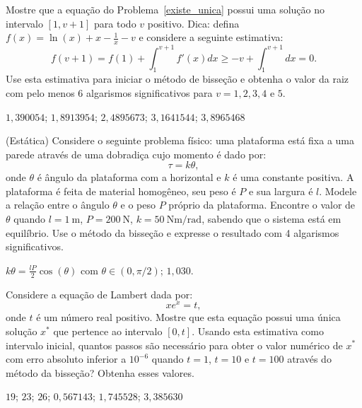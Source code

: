 \begin{exer} Mostre que a equação do Problema~\ref{existe_unica} possui uma solução no intervalo $[1, v+1]$ para todo $v$ positivo. Dica: defina $f(x)=\ln(x)+x-\frac{1}{x}-v$  e considere a seguinte estimativa:
  \begin{equation}
    f(v+1)=f(1)+\int_1^{v+1}f'(x)dx\geq -v+\int_1^{v+1}dx=0.
  \end{equation}
Use esta estimativa para iniciar o método de bisseção e obtenha o valor da raiz com pelo menos 6 algarismos significativos para $v=1, 2, 3, 4$ e $5$.
\end{exer}
\begin{resp}
    $1,390054$; $1,8913954$; $2,4895673$; $3,1641544$; $3,8965468$
\end{resp}

\begin{exer}(Estática) Considere o seguinte problema físico: uma plataforma está fixa a uma parede através de uma dobradiça cujo momento é dado por:
  \begin{equation}
    \tau=k\theta,
  \end{equation}
onde $\theta$ é ângulo da plataforma com a horizontal e $k$ é uma constante positiva. A plataforma é feita de material homogêneo, seu peso é $P$ e sua largura é $l$. Modele a relação entre o ângulo $\theta$ e o peso $P$ próprio da plataforma. Encontre o valor de $\theta$ quando $l=1~\mbox{m}$, $P=200~\mbox{N}$, $k=50~\mbox{Nm}/\mbox{rad}$, sabendo que o sistema está em equilíbrio. Use o método da bisseção e expresse o resultado com 4 algarismos significativos.
\end{exer}
\begin{resp}
    $k\theta=\frac{lP}{2}\cos(\theta)$ com $\theta\in (0, \pi/2)$; $1,030$.
\end{resp}


\begin{exer} Considere a equação de Lambert dada por:
  \begin{equation}
    xe^x= t,
  \end{equation}
onde $t$ é um número real positivo. Mostre que esta equação possui uma única solução $x^*$ que pertence ao intervalo $[0, t]$. Usando esta estimativa como intervalo inicial, quantos passos são necessário para obter o valor numérico de $x^*$ com erro absoluto inferior a $10^{-6}$ quando $t=1$, $t=10$ e $t=100$ através do método da bisseção? Obtenha esses valores.
\end{exer}
\begin{resp}
    $19$; $23$; $26$; $0,567143$; $1,745528$; $3,385630$
\end{resp}

